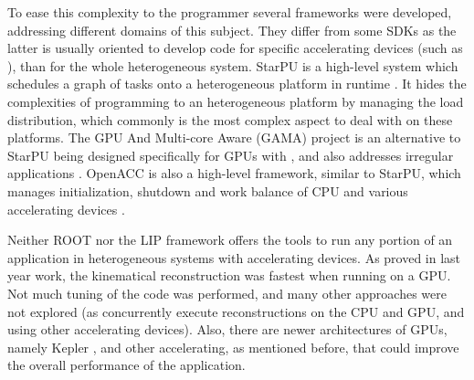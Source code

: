 To ease this complexity to the programmer several frameworks were developed, addressing different domains of this subject. They differ from some SDKs as the latter is usually oriented to develop code for specific accelerating devices (such as \nvidia \cuda \cite{NVIDIA:CUDA}), than for the whole heterogeneous system. StarPU is a high-level system which schedules a graph of tasks onto a heterogeneous platform in runtime \cite{StarPU}. It hides the complexities of programming to an heterogeneous platform by managing the load distribution, which commonly is the most complex aspect to deal with on these platforms. The GPU And Multi-core Aware (GAMA) project is an alternative to StarPU being designed specifically for GPUs with \cuda, and also addresses irregular applications \cite{Barbosa:2012,Mariano:Alves:2012,Alves:2012}. OpenACC is also a high-level framework, similar to StarPU, which manages initialization, shutdown and work balance of CPU and various accelerating devices \cite{OpenACC}.

Neither ROOT nor the LIP framework offers the tools to run any portion of an application in heterogeneous systems with accelerating devices. As proved in last year work, the kinematical reconstruction was fastest when running on a GPU. Not much tuning of the code was performed, and many other approaches were not explored (as concurrently execute reconstructions on the CPU and GPU, and using other accelerating devices). Also, there are newer architectures of GPUs, namely Kepler \cite{NVIDIA:Kepler}, and other accelerating, as mentioned before, that could improve the overall performance of the application.
